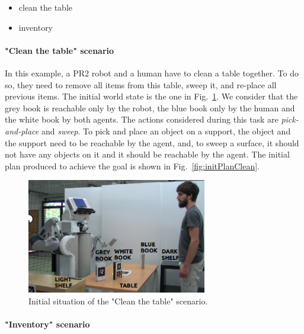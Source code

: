 \documentclass[english,a4paper,11pt,twoside]{StyleThese}
\begin{document}
\begin{itemize}
\item clean the table
\item inventory
\end{itemize}

\paragraph{"Clean the table" scenario}


In this example, a PR2 robot and a human have to clean a table together. To do so, they need to remove all items from this table, sweep it, and re-place all previous items. The initial world state is the one in Fig.~\ref{fig:initClean}. We consider that the grey book is reachable only by the robot, the blue book only by the human and the white book by both agents. The actions considered during this task are \textit{pick-and-place} and \textit{sweep}. To pick and place an object on a support, the object and the support need to be reachable by the agent, and, to sweep a surface, it should not have any objects on it and it should be reachable by the agent. The initial plan produced to achieve the goal is shown in  Fig.~\ref{fig:initPlanClean}.

\begin{figure}[!h]
	\centering
    \includegraphics[width=0.7\textwidth]{figs/Chapter3/cleanWithNames.png}
    \caption{Initial situation of the "Clean the table" scenario.}
    \label{fig:initClean}
\end{figure}

\paragraph{"Inventory" scenario}
\end{document}
